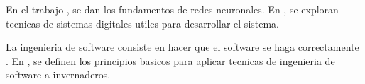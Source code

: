 \documentclass[12pt]{article}
\begin{document}
En el trabajo \cite{MarcoNuno2001}, se dan 
los fundamentos de redes neuronales. 
En \cite{LibroSistDigitales}, se exploran 
tecnicas  de sistemas digitales utiles 
para desarrollar el sistema.  

La ingenieria de software consiste en hacer 
que el software se haga correctamente 
\cite{LibroIngSoftware}. En \cite{RevistaITSA}, 
se definen los  principios basicos para aplicar 
tecnicas  de ingenieria de  software a 
invernaderos. 

\end{document}
